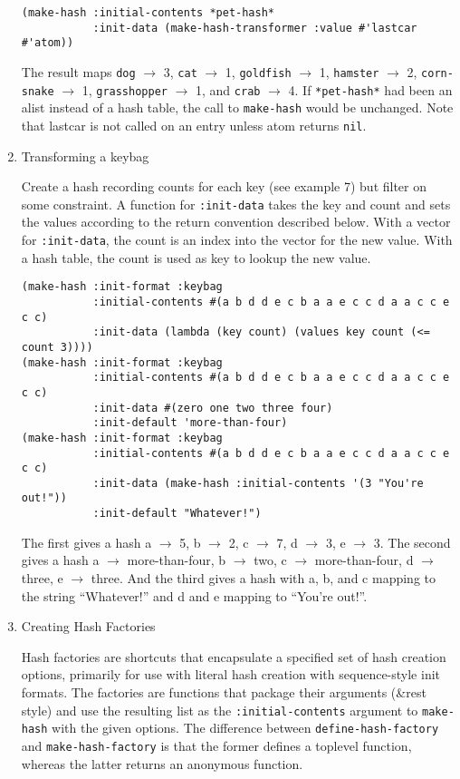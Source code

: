 \documentclass[11pt]{article}
\begin{document}
\begin{enumerate}
\begin{verbatim}
(make-hash :initial-contents *pet-hash*
           :init-data (make-hash-transformer :value #'lastcar #'atom))
\end{verbatim}




     The result maps \texttt{dog} $\to$ 3, \texttt{cat} $\to$ 1, \texttt{goldfish} $\to$ 1, \texttt{hamster} $\to$ 2,
     \texttt{corn-snake} $\to$ 1, \texttt{grasshopper} $\to$ 1, and \texttt{crab} $\to$ 4. If \texttt{*pet-hash*}
     had been an alist instead of a hash table, the call to \texttt{make-hash}
     would be unchanged. Note that lastcar is not called on an entry unless
     atom returns \texttt{nil}.
\item Transforming a keybag

     Create a hash recording counts for each key (see example 7) but filter
     on some constraint. A function for \texttt{:init-data} takes the key and count
     and sets the values according to the return convention described below.
     With a vector for \texttt{:init-data}, the count is an index into the vector
     for the new value. With a hash table, the count is used as key to
     lookup the new value.
     

\begin{verbatim}
(make-hash :init-format :keybag
           :initial-contents #(a b d d e c b a a e c c d a a c c e c c)
           :init-data (lambda (key count) (values key count (<= count 3))))
(make-hash :init-format :keybag
           :initial-contents #(a b d d e c b a a e c c d a a c c e c c)
           :init-data #(zero one two three four)
           :init-default 'more-than-four)
(make-hash :init-format :keybag
           :initial-contents #(a b d d e c b a a e c c d a a c c e c c)
           :init-data (make-hash :initial-contents '(3 "You're out!"))
           :init-default "Whatever!")
\end{verbatim}




     The first gives a hash a $\to$ 5, b $\to$ 2, c $\to$ 7, d $\to$ 3, e $\to$ 3.
     The second gives a hash a $\to$ more-than-four, b $\to$ two, c $\to$ more-than-four,
     d $\to$ three, e $\to$ three. And the third gives a hash with a, b, and c
     mapping to the string ``Whatever!'' and d and e mapping to ``You're out!''.
\item Creating Hash Factories

     Hash factories are shortcuts that encapsulate a specified set of hash creation options,
     primarily for use with literal hash creation with sequence-style init formats.
     The factories are functions that package their arguments (\&rest style) and
     use the resulting list as the \texttt{:initial-contents} argument to \texttt{make-hash}
     with the given options. The difference between \texttt{define-hash-factory} and
     \texttt{make-hash-factory} is that the former defines a toplevel function, whereas
     the latter returns an anonymous function.



\end{enumerate}
\end{document}
